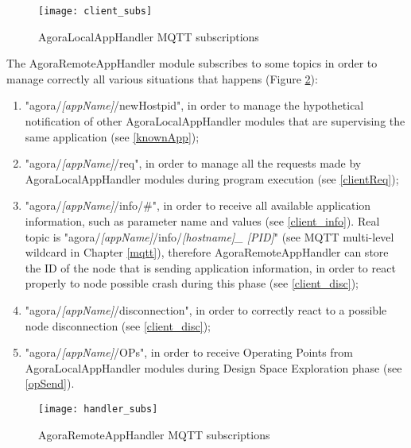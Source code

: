 \begin{figure}[t]

    \centering
    \texttt{[image: client\_subs]}
    \caption{AgoraLocalAppHandler MQTT subscriptions}

    \label{fig::localSubs}
    
\end{figure}

The AgoraRemoteAppHandler module subscribes to some topics in order to manage correctly all various situations that happens (Figure \ref{fig::remotSubs}):

\begin{enumerate}

    \item "agora/\textit{[appName]}/newHostpid", in order to manage the hypothetical notification of other AgoraLocalAppHandler modules that are supervising the same application (see \ref{knownApp});
    
    \item "agora/\textit{[appName]}/req", in order to manage all the requests made by AgoraLocalAppHandler modules during program execution (see \ref{clientReq});
    
    \item "agora/\textit{[appName]}/info/\#", in order to receive all available application information, such as parameter name and values (see \ref{client_info}). Real topic is "agora\slash{}\textit{[appName]}\slash{}info\slash{}\textit{[host\-name]\_ [PID]}" (see MQTT multi-level wildcard in Chapter \ref{mqtt}), therefore Agora\-Remote\-App\-Handler can store the ID of the node that is sending application information, in order to react properly to node possible crash during this phase (see \ref{client_disc});
    
    \item "agora/\textit{[appName]}/disconnection", in order to correctly react to a possible node disconnection (see \ref{client_disc});
    
    \item "agora/\textit{[appName]}/OPs", in order to receive Operating Points from AgoraLocalAppHandler modules during Design Space Exploration phase (see \ref{opSend}).

\end{enumerate}

\begin{figure}[t]

    \centering
    \texttt{[image: handler\_subs]}
    \caption{AgoraRemoteAppHandler MQTT subscriptions}

    \label{fig::remotSubs}
    
\end{figure}


